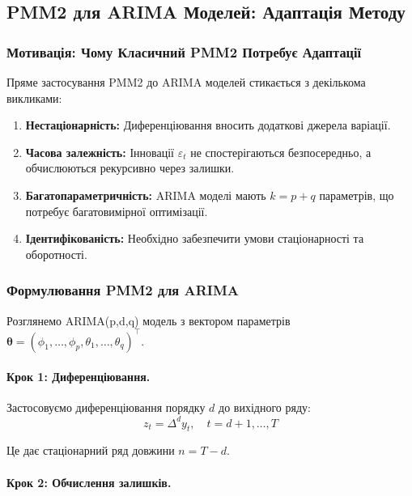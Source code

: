 \documentclass[12pt,a4paper]{article}
\begin{document}
\subsection{PMM2 для ARIMA Моделей: Адаптація Методу}
\label{subsec:pmm2_arima}

\subsubsection{Мотивація: Чому Класичний PMM2 Потребує Адаптації}

Пряме застосування PMM2 до ARIMA моделей стикається з декількома викликами:

\begin{enumerate}
    \item \textbf{Нестаціонарність:} Диференціювання вносить додаткові джерела варіації.

    \item \textbf{Часова залежність:} Інновації $\varepsilon_t$ не спостерігаються безпосередньо, а обчислюються рекурсивно через залишки.

    \item \textbf{Багатопараметричність:} ARIMA моделі мають $k = p + q$ параметрів, що потребує багатовимірної оптимізації.

    \item \textbf{Ідентифікованість:} Необхідно забезпечити умови стаціонарності та оборотності.
\end{enumerate}

\subsubsection{Формулювання PMM2 для ARIMA}

Розглянемо ARIMA(p,d,q) модель з вектором параметрів $\boldsymbol{\theta} = (\phi_1, \ldots, \phi_p, \theta_1, \ldots, \theta_q)^\top$.

\paragraph{Крок 1: Диференціювання.}

Застосовуємо диференціювання порядку $d$ до вихідного ряду:
\begin{equation}
\label{eq:differenced_series}
z_t = \Delta^d y_t, \quad t = d+1, \ldots, T
\end{equation}

Це дає стаціонарний ряд довжини $n = T - d$.

\paragraph{Крок 2: Обчислення залишків.}
\end{document}
